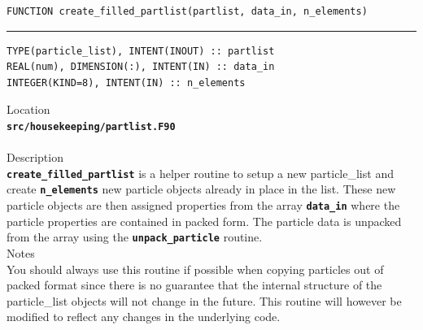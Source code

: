 \documentclass[12pt,a4paper]{article}
\newcommand{\HRule}{\rule{\linewidth}{0.5mm}}
\newcommand{\inlinecode}[1]{{\color{warwickred} \bf\texttt{#1}}}
\newcommand{\codedef}{\begin{Verbatim}[formatcom=\color{warwickred},fontsize=\Large,hfuzz=0pt]}
\newcommand{\coderule}{
{\color{warwickred}\vspace{-0.5cm}\HRule}
\codedef}
\begin{document}
\pagebreak
\codedef
FUNCTION create_filled_partlist(partlist, data_in, n_elements)
\end{Verbatim}
\coderule
TYPE(particle_list), INTENT(INOUT) :: partlist
REAL(num), DIMENSION(:), INTENT(IN) :: data_in
INTEGER(KIND=8), INTENT(IN) :: n_elements
\end{Verbatim}
\vspace{1cm}
{\Large Location\\}
\inlinecode{src/housekeeping/partlist.F90}\\
\\[0.5cm]
{\Large Description\\}
\inlinecode{create\_filled\_partlist} is a helper routine to setup a new
particle\_list and create \inlinecode{n\_elements} new particle objects already
in place in the list. These new particle objects are then assigned properties
from the array \inlinecode{data\_in} where the particle properties are contained
in packed form. The particle data is unpacked from the array using the
\inlinecode{unpack\_particle} routine.
\\[0.5cm]
{\Large Notes\\}
You should always use this routine if possible when copying particles out of
packed format since there is no guarantee that the internal structure of the
particle\_list objects will not change in the future. This routine will however
be modified to reflect any changes in the underlying code.
\end{document}

